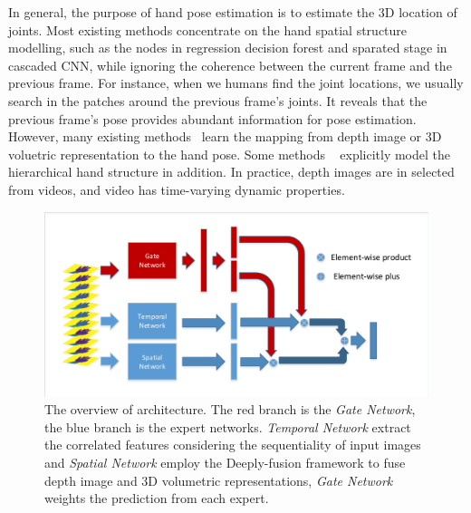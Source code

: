 \documentclass[journal,comsoc]{IEEEtran}
\let\MYoriglatexcaption\caption
\renewcommand{\caption}[2][\relax]{\MYoriglatexcaption[#2]{#2}}
\begin{document}
In general, the purpose of hand pose estimation is to estimate the 3D location of joints. Most existing
methods concentrate on the hand spatial structure modelling, such as the nodes in regression decision
forest and sparated stage in cascaded CNN, while ignoring the coherence between the current frame and
the previous frame. For instance, when we humans find the joint locations, we usually search in the
patches around the previous frame's joints. It reveals that the previous frame's pose provides abundant
information for pose estimation. However, many existing methods~\cite{oberweger2015hands, ge2017_3D} learn
the mapping from depth image or 3D voluetric representation to the hand pose. Some methods
~\cite{sun2015cascaded, ye2016spatial} explicitly model the hierarchical hand structure in addition. In
practice, depth images are in selected from videos, and video has time-varying dynamic properties.

\begin{figure}[t]
    \centering
    \includegraphics[width=1\linewidth]{src/network/architecture.pdf}
    \caption{The overview of architecture. The red branch is the \emph{Gate Network}, the blue
    branch is the expert networks. \emph{Temporal Network} extract the correlated features considering
    the sequentiality of input images and \emph{Spatial Network} employ the Deeply-fusion framework to
    fuse depth image and 3D volumetric representations, \emph{Gate Network} weights the prediction
    from each expert.}
\label{fig:architecture}
\end{figure}
\end{document}
